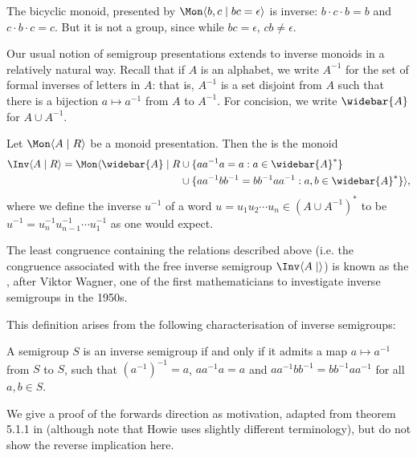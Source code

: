 \documentclass[noindex,noinsetproof,emphthm,12pt]{lmaths}
\newcommand{\Abar}{\widebar{A}}
\begin{document}
\begin{example}
The bicyclic monoid, presented by $\Mon \langle b, c \mid bc = \epsilon \rangle$  is inverse: $b\cdot c\cdot b = b$ and $c\cdot b \cdot c = c$. But it is not a group, since while $bc = \epsilon$, $cb \ne \epsilon$.
\end{example}

Our usual notion of semigroup presentations extends to inverse monoids in a relatively natural way. Recall that if $A$ is an alphabet, we write $A^{-1}$ for the set of formal inverses of letters in $A$: that is, $A^{-1}$ is a set disjoint from $A$ such that there is a bijection $a \mapsto a^{-1}$ from $A$ to $A^{-1}$. For concision, we write $\Abar$ for $A \cup A^{-1}$.

\begin{defn}
	Let $\Mon \langle A \mid R \rangle$ be a monoid presentation. Then the  is the monoid
	\begin{align*}
		\Inv \langle A \mid R \rangle = \Mon \langle \Abar \mid R &\cup \{ aa^{-1}a = a : a \in \Abar^* \} \\
		&\cup \{ aa^{-1}bb^{-1} = bb^{-1}aa^{-1} : a, b \in \Abar^* \}\rangle,
	\end{align*}
	where we define the inverse $u^{-1}$ of a word $u = u_1u_2\cdots u_n \in (A \cup A^{-1})^*$ to be $u^{-1} = u_n^{-1} u_{n-1}^{-1} \cdots u_1^{-1}$ as one would expect.
\end{defn}

The least congruence containing the relations described above (i.e. the congruence associated with the free inverse semigroup $\Inv \langle A \mid\rangle$) is known as the , after Viktor Wagner, one of the first mathematicians to investigate inverse semigroups in the 1950s.

This definition arises from the following characterisation of inverse semigroups:
\begin{theorem} \label{thm:inv-semigp-cond}
	A semigroup $S$ is an inverse semigroup if and only if it admits a map $a \mapsto a^{-1}$ from $S$ to $S$, such that $(a^{-1})^{-1} = a$, $aa^{-1}a = a$ and $aa^{-1}bb^{-1} = bb^{-1}aa^{-1}$ for all $a, b \in S$.
\end{theorem}

We give a proof of the forwards direction as motivation, adapted from theorem 5.1.1 in \cite{Howie1995} (although note that Howie uses slightly different terminology), but do not show the reverse implication here.
\end{document}
